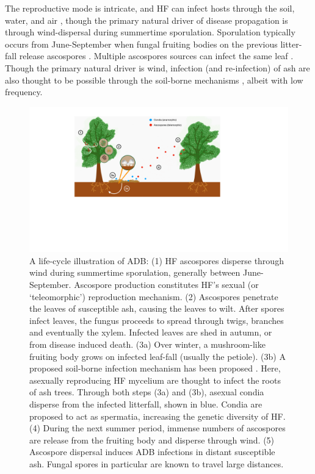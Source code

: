 The reproductive mode is intricate, and HF can infect hosts through the soil,
water, and air \cite{gross2012reproductive}, though the primary natural driver of disease propagation is through wind-dispersal
during summertime sporulation. Sporulation typically occurs from June-September when 
fungal fruiting bodies on the previous litter-fall release ascospores \cite{grosdidier2018tracking, hietala2013invasive}.
Multiple ascospores sources can infect the same leaf \cite{gross2012reproductive}. 
Though the primary natural driver is wind, infection (and re-infection) of ash are also thought to be possible 
through the soil-borne mechanisms \cite{fones2016role}, albeit with low frequency.

\begin{figure}
    \centering
    \includegraphics[scale=0.425]{chapter2/figures/ash-dieback-illustration.pdf}
    \caption{A life-cycle illustration of ADB: 
    (1) HF ascospores disperse through wind during summertime sporulation, generally between June-September.
    Ascospore production constitutes HF's sexual (or `teleomorphic') reproduction mechanism.
    (2) Ascospores penetrate the leaves of susceptible ash, causing the leaves to wilt.
       After spores infect leaves, the fungus proceeds to spread through twigs, branches and eventually the xylem.
       Infected leaves are shed in autumn, or from disease induced death.
    (3a) Over winter, a mushroom-like fruiting body grows on infected leaf-fall (usually the petiole).
    (3b) A proposed soil-borne infection mechanism has been proposed \cite{fones2016role}.
        Here, asexually reproducing HF mycelium are thought to infect the roots of ash trees.
    Through both steps (3a) and (3b), asexual condia disperse from the infected litterfall, shown in blue.
    Condia are proposed to act as spermatia, increasing the genetic diversity of HF.
    (4) During the next summer period, immense numbers of ascospores are release from the fruiting body
    and disperse through wind.
    (5) Ascospore dispersal induces ADB infections in distant susceptible ash. Fungal spores in particular 
    are known to travel large distances.
    }
    \label{fig:my_label}
\end{figure}

